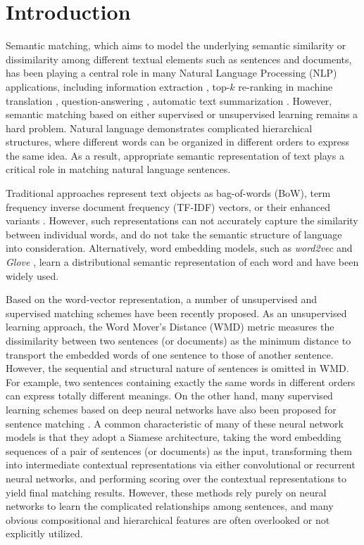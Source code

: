\section{Introduction}
\label{sec:intro}

Semantic matching, which aims to model the underlying semantic similarity or dissimilarity among different textual elements such as sentences and documents, has been playing a central role in many Natural Language Processing (NLP) applications, including information extraction \cite{grishman1997information}, top-$k$ re-ranking in machine translation \cite{brown1993mathematics}, question-answering \cite{yu2014deep}, automatic text summarization \cite{ponzanelli2015summarizing}.
However, semantic matching based on either supervised or unsupervised learning remains a hard problem. Natural language demonstrates complicated hierarchical structures, where different words can be organized in different orders to express the same idea. As a result, appropriate semantic representation of text plays a critical role in matching natural language sentences.

Traditional approaches represent text objects as bag-of-words (BoW), term frequency inverse document frequency (TF-IDF) \cite{wu2008interpreting} vectors, or their enhanced variants \cite{paltoglou2010study,robertson1994some}. However, such representations can not accurately capture the similarity between individual words, and do not take the semantic structure of language into consideration. 
Alternatively, word embedding models, such as \textit{word2vec} \cite{mikolov2013efficient} and \textit{Glove} \cite{pennington2014glove}, learn a distributional semantic representation of each word and have been widely used. 

Based on the word-vector representation, a number of unsupervised and supervised matching schemes have been recently proposed.
As an unsupervised learning approach, the Word Mover's Distance (WMD) metric \cite{kusner2015word} measures the dissimilarity between two sentences (or documents) as the minimum distance to transport the embedded words of one sentence to those of another sentence. However, the sequential and structural nature of sentences is omitted in WMD. For example, two sentences containing  exactly the same words in different orders can express totally different meanings.
On the other hand, many supervised learning schemes based on deep neural networks have also been proposed for sentence matching \cite{mueller2016siamese,severyn2015learning,wang2017bilateral,pang2016text}. A common characteristic of many of these neural network models is that they adopt a Siamese architecture, taking the word embedding sequences of a pair of sentences (or documents) as the input, transforming them into intermediate contextual representations via either convolutional or recurrent neural networks, and performing scoring over the contextual representations to yield final matching results. However, these methods rely purely on neural networks to learn the complicated relationships among sentences, and many obvious compositional and hierarchical features are often overlooked or not explicitly utilized.


